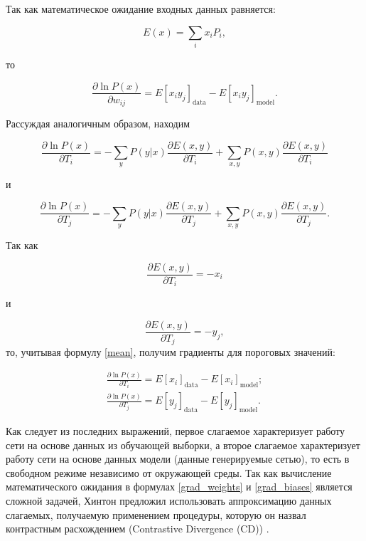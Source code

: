 Так как математическое ожидание входных данных равняется:
	
\begin{equation}
		\label{mean}
		E(x)=\sum_i x_iP_i,
\end{equation}	  
	
то
	
\begin{equation}
    \label{grad_weights}
	\frac{\partial \ln P(x)}{\partial w_{ij}}=E\left[x_iy_j\right]_{\text{data}}-E\left[x_iy_j\right]_{\text{model}}.
\end{equation}
	
Рассуждая аналогичным образом, находим
	
\begin{equation*}
	\frac{\partial \ln P(x)}{\partial T_{i}}=-\sum_y P(y \lvert x)\frac{\partial E(x,y)}{\partial T_{i}} + \sum_{x,y} P(x,y)\frac{\partial E(x,y)}{\partial T_{i}}
\end{equation*}
	
и
	
\begin{equation*}
	\frac{\partial \ln P(x)}{\partial T_{j}}=-\sum_y P(y \lvert x)\frac{\partial E(x,y)}{\partial T_{j}} + \sum_{x,y} P(x,y)\frac{\partial E(x,y)}{\partial T_{j}}.
\end{equation*}
	
Так как
	
\begin{equation*}
	\frac{\partial E(x,y)}{\partial T_{i}}=-x_i 
\end{equation*}
	
и 
	
\begin{equation*}
	\frac{\partial E(x,y)}{\partial T_{j}}=-y_j,
\end{equation*}
то, учитывая формулу \ref{mean}, получим градиенты для пороговых значений:
	
\begin{equation}
\label{grad_biases}
\begin{aligned}
	\frac{\partial \ln P(x)}{\partial T_i}=E\left[x_i\right]_{\text{data}}-E\left[x_i\right]_{\text{model}};\\
	\frac{\partial \ln P(x)}{\partial T_j}=E\left[y_j\right]_{\text{data}}-E\left[y_j\right]_{\text{model}}.
\end{aligned}
\end{equation}
	
Как следует из последних выражений, первое слагаемое характеризует работу сети на основе данных из обучающей выборки, а  второе слагаемое характеризует работу сети на основе данных модели (данные генерируемые сетью), то есть в свободном режиме независимо от окружающей среды.
Так как вычисление математического ожидания в формулах \ref{grad_weights} и \ref{grad_biases} является сложной задачей, Хинтон предложил использовать аппроксимацию данных слагаемых, получаемую применением процедуры, которую он назвал контрастным расхождением (Contrastive Divergence (CD)) \cite{n1}.
	
